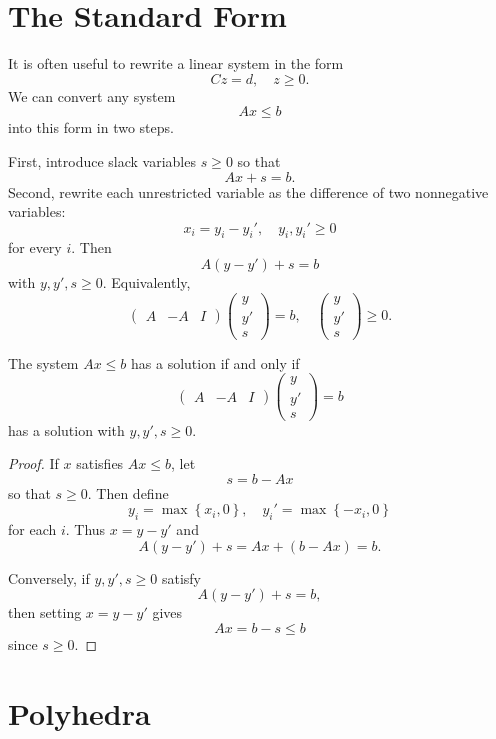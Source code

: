 \section{The Standard Form}

It is often useful to rewrite a linear system in the form
\[
	Cz = d, \quad z \ge 0
.\]
We can convert any system
\[
	Ax \le b
\]
into this form in two steps.

First, introduce slack variables $s \ge 0$ so that
\[
	Ax + s = b
.\]
Second, rewrite each unrestricted variable as the difference of two nonnegative variables:
\[
	x_i = y_i - y_i', \quad y_i,y_i' \ge 0
\]
for every $i$. Then
\[
	A\left( y-y' \right) + s = b
\]
with $y,y',s \ge 0$. Equivalently,
\[
	\begin{pmatrix}
		A & -A & I
	\end{pmatrix}
	\begin{pmatrix}
		y \\ y' \\ s
	\end{pmatrix}
	= b,
	\quad
	\begin{pmatrix}
		y \\ y' \\ s
	\end{pmatrix}
	\ge 0
.\]

\begin{proposition}
	The system $Ax \le b$ has a solution if and only if
	\[
		\begin{pmatrix}
			A & -A & I
		\end{pmatrix}
		\begin{pmatrix}
			y \\ y' \\ s
		\end{pmatrix}
		= b
	\]
	has a solution with $y,y',s \ge 0$.
\end{proposition}
\begin{proof}
	If $x$ satisfies $Ax \le b$, let
	\[
		s = b-Ax
	\]
	so that $s \ge 0$. Then define
	\[
		y_i = \max\left\{x_i,0\right\}, \quad y_i' = \max\left\{-x_i,0\right\}
	\]
	for each $i$. Thus $x = y-y'$ and
	\[
		A\left( y-y' \right) + s = Ax + (b-Ax) = b
	.\]

	Conversely, if $y,y',s \ge 0$ satisfy
	\[
		A\left( y-y' \right) + s = b
	,\]
	then setting $x = y-y'$ gives
	\[
		Ax = b-s \le b
	\]
	since $s \ge 0$.
\end{proof}

\section{Polyhedra}

